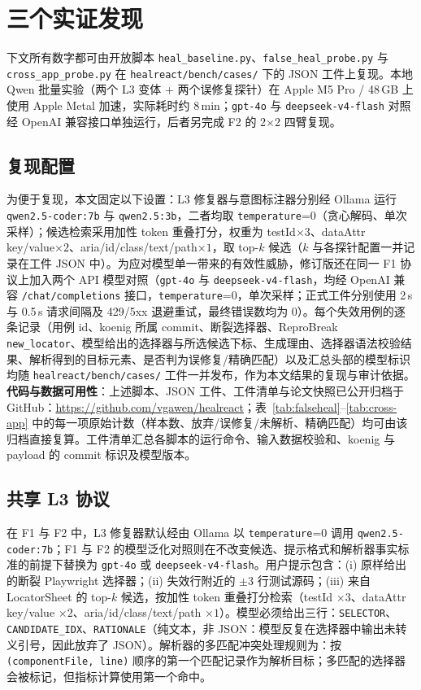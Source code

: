 \section{三个实证发现}
\label{sec:findings}

下文所有数字都可由开放脚本 \texttt{heal\_baseline.py}、\texttt{false\_heal\_probe.py} 与 \texttt{cross\_app\_probe.py} 在 \texttt{healreact/bench/cases/} 下的 JSON 工件上复现。本地 Qwen 批量实验（两个 L3 变体 + 两个误修复探针）在 Apple M5 Pro / 48\,GB 上使用 Apple Metal 加速，实际耗时约 8\,min；\texttt{gpt-4o} 与 \texttt{deepseek-v4-flash} 对照经 OpenAI 兼容接口单独运行，后者另完成 F2 的 2$\times$2 四臂复现。

\subsection{复现配置}
为便于复现，本文固定以下设置：L3 修复器与意图标注器分别经 Ollama 运行 \texttt{qwen2.5-coder:7b} 与 \texttt{qwen2.5:3b}，二者均取 \texttt{temperature}=0（贪心解码、单次采样）；候选检索采用加性 token 重叠打分，权重为 testId$\times 3$、dataAttr key/value$\times 2$、aria/id/class/text/path$\times 1$，取 top-$k$ 候选（$k$ 与各探针配置一并记录在工件 JSON 中）。为应对模型单一带来的有效性威胁，修订版还在同一 F1 协议上加入两个 API 模型对照（\texttt{gpt-4o} 与 \texttt{deepseek-v4-flash}，均经 OpenAI 兼容 \texttt{/chat/completions} 接口，\texttt{temperature}=0，单次采样；正式工件分别使用 2\,s 与 0.5\,s 请求间隔及 429/5xx 退避重试，最终错误数均为 0）。每个失效用例的逐条记录（用例 id、koenig 所属 commit、断裂选择器、ReproBreak \texttt{new\_locator}、模型给出的选择器与所选候选下标、生成理由、选择器语法校验结果、解析得到的目标元素、是否判为误修复/精确匹配）以及汇总头部的模型标识均随 \texttt{healreact/bench/cases/} 工件一并发布，作为本文结果的复现与审计依据。\textbf{代码与数据可用性}：上述脚本、JSON 工件、工件清单与论文快照已公开归档于 GitHub：\url{https://github.com/vgawen/healreact}；表~\ref{tab:falseheal}--\ref{tab:cross-app} 中的每一项原始计数（样本数、放弃/误修复/未解析、精确匹配）均可由该归档直接复算。工件清单汇总各脚本的运行命令、输入数据校验和、koenig 与 payload 的 commit 标识及模型版本。

\subsection{共享 L3 协议}
在 F1 与 F2 中，L3 修复器默认经由 Ollama 以 \texttt{temperature}=0 调用 \texttt{qwen2.5-coder:7b}；F1 与 F2 的模型泛化对照则在不改变候选、提示格式和解析器事实标准的前提下替换为 \texttt{gpt-4o} 或 \texttt{deepseek-v4-flash}。用户提示包含：(i) 原样给出的断裂 Playwright 选择器；(ii) 失效行附近的 $\pm 3$ 行测试源码；(iii) 来自 LocatorSheet 的 top-$k$ 候选，按加性 token 重叠打分检索（testId $\times 3$、dataAttr key/value $\times 2$、aria/id/class/text/path $\times 1$）。模型必须给出三行：\texttt{SELECTOR}、\texttt{CANDIDATE\_IDX}、\texttt{RATIONALE}（纯文本，非 JSON：模型反复在选择器中输出未转义引号，因此放弃了 JSON）。解析器的多匹配冲突处理规则为：按 \texttt{(componentFile, line)} 顺序的第一个匹配记录作为解析目标；多匹配的选择器会被标记，但指标计算使用第一个命中。

